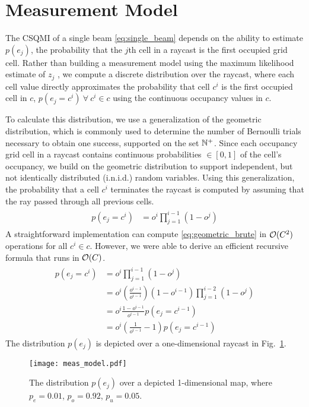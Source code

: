 \section{Measurement Model}
\label{sec:measurement_model}

The CSQMI of a single beam \eqref{eq:single_beam} depends on the ability
to estimate $p(e_j)$, the probability that the $j$th cell in a raycast is
the first occupied grid cell. Rather than building a measurement model using the
maximum likelihood estimate of $z_{j}$ \cite{charrow15,
thrun2005probabilistic, julian2013mutual}, we compute a discrete distribution over the
raycast, where each cell value directly approximates the probability that cell $c^i$ is the
first occupied cell in $c$, $p(e_j = c^i) \ \forall\ c^{i} \in c$ using the
continuous occupancy values in $c$.

To calculate this distribution, we use a generalization of the geometric
distribution, which is commonly used to determine the number of Bernoulli trials necessary to obtain one success, supported
on the set ${\mathbb{N}}^{+}$. Since each occupancy grid cell in a raycast contains
continuous probabilities $\in [0, 1]$ of the cell's occupancy, we build on the
geometric distribution to support independent, but not identically distributed
(i.n.i.d.) random variables. Using this generalization, the probability that a cell $c^{i}$ terminates the raycast is computed by assuming that the ray passed through all previous cells.
%
\begin{align}
  \begin{split}
    p(e_j = c^{i})
    &=
    o^{i}
    \prod_{j=1}^{i-1}
    (1 - o^{j})
    \label{eq:geometric_brute}
  \end{split}
\end{align}
%
A straightforward implementation can compute \eqref{eq:geometric_brute} in $\mathcal{O}(C^2)$ operations for all $c^{i} \in c$. However, we were able to derive an efficient recursive formula that runs in $\mathcal{O}(C)$.
%
\begin{align}
  \begin{split}
    p(e_j = c^{i})
    &=
    o^{i}
    \prod_{j=1}^{i-1}
    (1 - o^{j}) \\
    &=
    o^{i}
    \left(
    \frac
    {o^{i-1}}
    {o^{i-1}}
    \right)
    (1 - o^{i-1})
    \prod_{j=1}^{i-2}
    (1 - o^{j}) \\
    &=
    o^{i}
    \frac
    {
      1 - o^{i-1}
    }
    {
      o^{i-1}
    }
    p(e_j = c^{i-1}) \\
    &=
    o^{i}
    \left(
    \frac{1}{o^{i-1}}
      -
      1
    \right)
    p(e_j = c^{i-1})
  \end{split}
\end{align}
%
The distribution $p(e_j)$ is depicted over a one-dimensional raycast in Fig.~\ref{fig:measurement_model}.

\begin{figure}
  \centering
  \texttt{[image: meas\_model.pdf]}
  \caption{The distribution $p(e_j)$ over a depicted 1-dimensional map, where $p_{e} = 0.01$, $p_{o} = 0.92$, $p_{u} = 0.05$. \label{fig:measurement_model}}
\end{figure}

